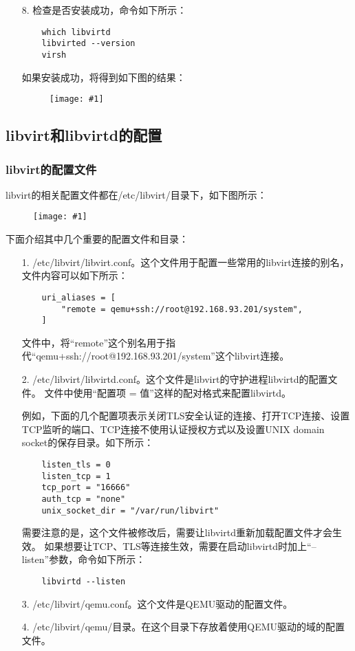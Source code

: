 \documentclass[a4paper,left=2.5cm,right=2.5cm,11pt]{article}
\newcommand{\fic}[1]{\begin{figure}[H]
		\center
		\texttt{[image: \#1]}
	\end{figure}}
\newcommand{\sizedfic}[2]{\begin{figure}[H]
		\center
		\texttt{[image: \#2]}
	\end{figure}}
\begin{document}
\begin{itemize}
		将文件内容写为下图中的内容：
		\sizedfic{0.5}{1.png}

		然后再输入如下命令：
		\begin{lstlisting}
	sudo ldconfig
		\end{lstlisting}

		\item[8.] 检查是否安装成功，命令如下所示：
		\begin{lstlisting}
	which libvirtd
	libvirted --version
	virsh
		\end{lstlisting}

		如果安装成功，将得到如下图的结果：
		\fic{2.png}
	\end{itemize}

\subsection{libvirt和libvirtd的配置}
\subsubsection{libvirt的配置文件}
	libvirt的相关配置文件都在/etc/libvirt/目录下，如下图所示：
	\fic{3.png}

	下面介绍其中几个重要的配置文件和目录：
	\begin{itemize}
		\item[1.] /etc/libvirt/libvirt.conf。这个文件用于配置一些常用的libvirt连接的别名，文件内容可以如下所示：
		\begin{lstlisting}
	uri_aliases = [
		"remote = qemu+ssh://root@192.168.93.201/system",
	]
		\end{lstlisting}

		文件中，将“remote”这个别名用于指代“qemu+ssh://root@192.168.93.201/system”这个libvirt连接。

		\item[2.] /etc/libvirt/libvirtd.conf。这个文件是libvirt的守护进程libvirtd的配置文件。
		文件中使用“配置项 = 值”这样的配对格式来配置libvirtd。\par
		例如，下面的几个配置项表示关闭TLS安全认证的连接、打开TCP连接、设置TCP监听的端口、TCP连接不使用认证授权方式以及设置UNIX domain socket的保存目录。如下所示：
		\begin{lstlisting}
	listen_tls = 0
	listen_tcp = 1
	tcp_port = "16666"
	auth_tcp = "none"
	unix_socket_dir = "/var/run/libvirt"
		\end{lstlisting}

		需要注意的是，这个文件被修改后，需要让libvirtd重新加载配置文件才会生效。
		如果想要让TCP、TLS等连接生效，需要在启动libvirtd时加上“--listen”参数，命令如下所示：
		\begin{lstlisting}
	libvirtd --listen
		\end{lstlisting}

		\item[3.] /etc/libvirt/qemu.conf。这个文件是QEMU驱动的配置文件。
		\item[4.] /etc/libvirt/qemu/目录。在这个目录下存放着使用QEMU驱动的域的配置文件。
	\end{itemize}
\end{document}
